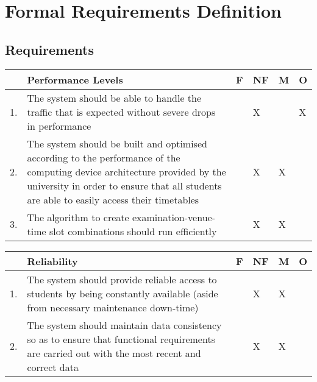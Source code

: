 \documentclass{article}
\begin{document}
\section{Formal Requirements Definition}

\subsection{Requirements}
\begin{center}
\begin{tabular}{|m{1cm}|m{10cm}|m{1cm}|m{1cm}|m{1cm}|m{1cm}|} 
\hline
 & \textbf{Performance Levels} & \textbf{F} & \textbf{NF} & \textbf{M} & \textbf{O} \\
\hline
1. & {The system should be able to handle the traffic that is expected without severe drops in performance} & & X & & X\\
\hline
2. & {The system should be built and optimised according to the performance of the computing device architecture provided by the university in order to ensure that all students are able to easily access their timetables} & & X & X & \\
\hline
3. & {The algorithm to create examination-venue-time slot combinations should run efficiently} & & X & X & \\
\hline
\end{tabular}
\end{center}

\begin{center}
\begin{tabular}{|m{1cm}|m{10cm}|m{1cm}|m{1cm}|m{1cm}|m{1cm}|} 
\hline
 & \textbf{Reliability} & \textbf{F} & \textbf{NF} & \textbf{M} & \textbf{O} \\
\hline
1. & {The system should provide reliable access to students by being constantly available (aside from necessary maintenance down-time)} & & X & X & \\
\hline
2. & {The system should maintain data consistency so as to ensure that functional requirements are carried out with the most recent and correct data} & & X & X & \\
\hline
\end{tabular}
\end{center}
\end{document}
